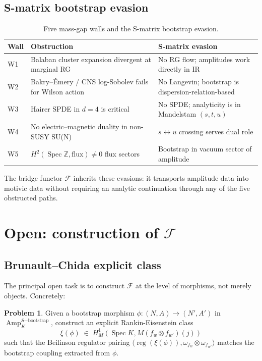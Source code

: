 \documentclass[11pt]{amsart}
\theoremstyle{definition}
\newtheorem{problem}[theorem]{Problem}
\theoremstyle{remark}
\DeclareMathOperator{\Spec}{Spec}
\DeclareMathOperator{\Amp}{Amp}
\DeclareMathOperator{\reg}{reg}
\newcommand{\Z}{\mathbb{Z}}
\begin{document}
\subsection{S-matrix bootstrap evasion}\label{ss:smatrix-evasion}

\begin{table}[h]\centering
\caption{Five mass-gap walls and the S-matrix bootstrap evasion.}
\label{tab:5walls-evasion}
\begin{tabular}{l|p{}|p{}}
\toprule
Wall & Obstruction & S-matrix evasion \\
\midrule
W1 & Balaban cluster expansion divergent at marginal RG &
No RG flow; amplitudes work directly in IR \\
W2 & Bakry--\'Emery / CNS log-Sobolev fails for Wilson action &
No Langevin; bootstrap is dispersion-relation-based \\
W3 & Hairer SPDE in $d = 4$ is critical &
No SPDE; analyticity is in Mandelstam $(s, t, u)$ \\
W4 & No electric--magnetic duality in non-SUSY SU(N) &
$s \leftrightarrow u$ crossing serves dual role \\
W5 & $H^2(\Spec \Z, \mathrm{flux}) \neq 0$ flux sectors &
Bootstrap in vacuum sector of amplitude \\
\bottomrule
\end{tabular}
\end{table}

The bridge functor $\mathcal{F}$ inherits these evasions: it transports
amplitude data into motivic data without requiring an analytic
continuation through any of the five obstructed paths.

\section{Open: construction of $\mathcal{F}$}\label{sec:open}

\subsection{Brunault--Chida explicit class}\label{ss:open-brunault-chida}

The principal open task is to construct $\mathcal{F}$ at the level of
morphisms, not merely objects. Concretely:

\begin{problem}\label{prob:brunault-chida-extension}
Given a bootstrap morphism $\phi \colon (N, A) \to (N', A')$ in
$\Amp_K^{S\mathrm{-bootstrap}}$, construct an explicit
Rankin-Eisenstein class
\[
\xi(\phi) \;\in\; H^1_M(\Spec K, M(f_w \otimes f_{w'})(j))
\]
such that the Beilinson regulator pairing
$\langle \reg(\xi(\phi)), \omega_{f_w} \otimes \omega_{f_{w'}} \rangle$
matches the bootstrap coupling extracted from $\phi$.
\end{problem}
\end{document}
